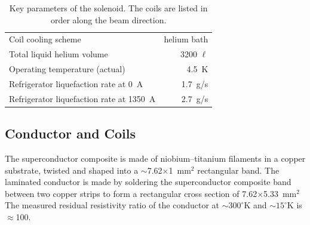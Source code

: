 \begin{table}[thp]
\begin{center}
\begin{tabular}{lr}
       Coil cooling scheme             & helium bath \\   
       Total liquid helium volume      & 3200 $\ell$ \\
       Operating temperature (actual)  &  4.5~K \\   
       Refrigerator liquefaction rate at 0~A        & 1.7~g/s    \\
       Refrigerator liquefaction rate at 1350~A     & 2.7~g/s    \\
     \hline
   \end{tabular}
   \normalsize
 \end{center}
  \caption{
    Key parameters of the \gx{} solenoid. The
    coils are listed in order along the beam direction.
    \label{tab:sol:summary}
  }
\end{table}


\subsection[Conductor and Coils]{Conductor and Coils
 \label{sec:sol:coils}
}

The superconductor composite is made of niobium--titanium filaments
in a copper substrate, twisted and shaped into a
$\sim$7.62$\times$1~mm$^2$ rectangular band. The laminated conductor
is made by soldering the superconductor composite band between two
copper strips
to form a rectangular cross section of 7.62$\times$5.33~mm$^2$
The measured residual resistivity ratio of the conductor at $\sim{}300^\circ{}$K and
$\sim{}15^\circ{}$K is $\approx{}$100.  

